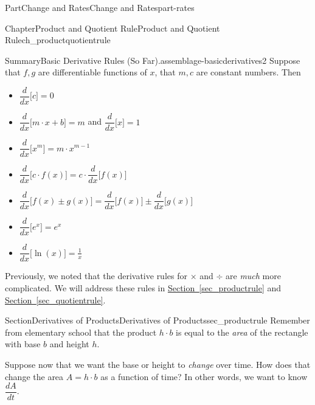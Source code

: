 \documentclass{tufte-book}
\newcommand{\xreffont}{\relax}
\numberwithin{equation}{chapter}
\newcommand{\ddx}[1]{ \dfrac{d}{dx} \Big[ #1 \Big]  }
\begin{document}
\begin{partptx}{Part}{Change and Rates}{}{Change and Rates}{}{}{part-rates}
\begin{chapterptx}{Chapter}{Product and Quotient Rule}{}{Product and Quotient Rule}{}{}{ch_productquotientrule}
\begin{introduction}{}
\begin{assemblage}{Summary}{Basic Derivative Rules (So Far).}{assemblage-basicderivatives2}
Suppose that \(f,g\) are differentiable functions of \(x\), that \(m,c\) are constant numbers.  Then%
\begin{itemize}[label=\textbullet]
\item{}\(\displaystyle \ddx{c}=0\)%
\item{}\(\ddx{m\cdot x+b}=m\) and \(\ddx{x} = 1\)%
\item{}\(\displaystyle \ddx{x^m}=m\cdot x^{m-1}\)%
\item{}\(\displaystyle \ddx{ c\cdot f(x)}=c\cdot \ddx{f(x)}\)%
\item{}\(\displaystyle \ddx{f(x) \pm g(x)} = \ddx{f(x)} \pm \ddx{g(x)}\)%
\item{}\(\displaystyle \ddx{ e^x } = e^x \)%
\item{}\(\displaystyle \ddx{ \ln(x) } = \frac{1}{x}\)%
\end{itemize}
%
\end{assemblage}
Previously, we noted that the derivative rules for \(\times\) and \(\div\) are \emph{much} more complicated.  We will address these rules in \hyperref[sec_productrule]{Section~{\xreffont\ref{sec_productrule}}} and \hyperref[sec_quotientrule]{Section~{\xreffont\ref{sec_quotientrule}}}.%
\end{introduction}%
%
%
\typeout{************************************************}
\typeout{************************************************}
%
\begin{sectionptx}{Section}{Derivatives of Products}{}{Derivatives of Products}{}{}{sec_productrule}
Remember from elementary school that the product \(h\cdot b\) is equal to the \emph{area} of the rectangle with base \(b\) and height \(h\).%
\par
Suppose now that we want the base or height to \emph{change} over time.  How does that change the area \(A = h\cdot b\) as a function of time? In other words, we want to know \(\dfrac{dA}{dt}\).%
\begin{image}{0.375}{0.25}{0.375}{}%
\end{image}
\end{sectionptx}
\end{chapterptx}
\end{partptx}
\end{document}
